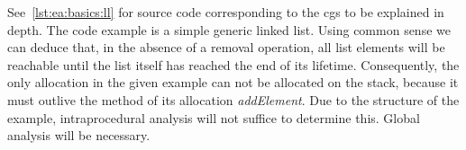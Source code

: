 
			See~\cref{lst:ea:basics:ll} for source code corresponding to the \glspl{cg} to be explained in depth. The code
			example is a simple generic linked list. Using common sense we can deduce that, in the absence of a removal
			operation, all list elements will be reachable until the list itself has reached the end of its lifetime.
			Consequently, the only allocation in the given example can not be allocated on the stack, because it must outlive
			the method of its allocation \emph{addElement}. Due to the structure of the example, intraprocedural analysis will
			not suffice to determine this. Global analysis will be necessary.

